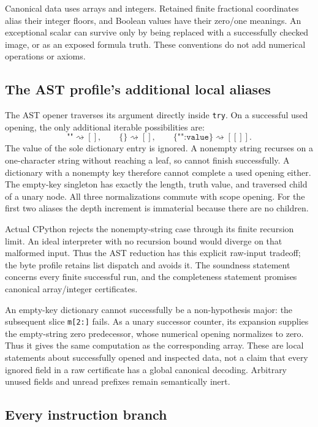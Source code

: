 \documentclass[11pt,letterpaper]{article}
\theoremstyle{definition}\newtheorem{definition}[theorem]{Definition}
\theoremstyle{remark}\newtheorem{remark}[theorem]{Remark}
\begin{document}
Canonical data uses arrays and integers. Retained finite fractional
coordinates alias their integer floors, and Boolean values have their
zero/one meanings. An exceptional scalar can survive only by being
replaced with a successfully checked image, or as an exposed formula
truth. These conventions do not add numerical operations or axioms.

\subsection{The AST profile's additional local aliases}

The AST opener traverses its argument directly inside \texttt{try}.
On a successful used opening, the only additional iterable possibilities
are:
\[
 \texttt{""}\rightsquigarrow[],\qquad
 \texttt{\{\}}\rightsquigarrow[],\qquad
 \texttt{\{"":value\}}\rightsquigarrow[[]].
\]
The value of the sole dictionary entry is ignored. A nonempty string
recurses on a one-character string without reaching a leaf, so cannot
finish successfully. A dictionary with a nonempty key therefore cannot
complete a used opening either. The empty-key singleton has exactly the
length, truth value, and traversed child of a unary node. All three
normalizations commute with scope opening. For the first two aliases the
depth increment is immaterial because there are no children.

Actual CPython rejects the nonempty-string case through its finite
recursion limit. An ideal interpreter with no recursion bound would
diverge on that malformed input. Thus the AST reduction has this explicit
raw-input tradeoff; the byte profile retains list dispatch and avoids it.
The soundness statement concerns every finite successful run, and the
completeness statement promises canonical array/integer certificates.

An empty-key dictionary cannot successfully be a non-hypothesis major:
the subsequent slice \texttt{m[2:]} fails. As a unary successor counter,
its expansion supplies the empty-string zero predecessor, whose numerical
opening normalizes to zero. Thus it gives the same computation as the
corresponding array. These are local statements about successfully opened
and inspected data, not a claim that every ignored field in a raw
certificate has a global canonical decoding. Arbitrary unused fields
and unread prefixes remain semantically inert.

\subsection{Every instruction branch}
\end{document}
